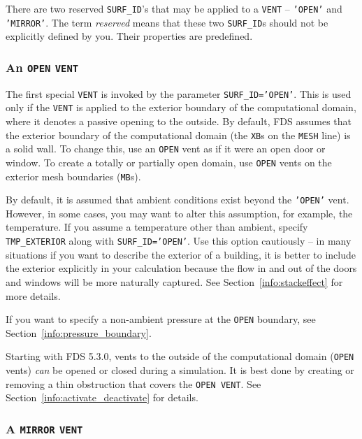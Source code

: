 \documentclass[11pt]{book}
\newcommand{\ct}{\tt\small}
\begin{document}
There are two reserved {\ct SURF\_ID}'s that may be applied to a {\ct VENT} -- {\ct 'OPEN'} and {\ct 'MIRROR'}. The term {\em reserved} means that these two
{\ct SURF\_ID}s should not be explicitly defined by you. Their properties are predefined.

\subsubsection{An \texorpdfstring{{\tt OPEN}}{OPEN} \texorpdfstring{{\tt VENT}}{VENT}}

The first special {\ct VENT} is invoked by the parameter {\ct SURF\_ID='OPEN'}. This is used only if the {\ct VENT}
is applied to the exterior boundary of the computational domain, where
it denotes a passive opening to the outside. By default, FDS assumes that the exterior boundary of the computational domain (the {\ct XB}s on the {\ct MESH} line) is a solid wall. To
change this, use an {\ct OPEN} vent as if it were an open door or window. To create a totally or partially open domain, use {\ct OPEN} vents on the exterior mesh boundaries ({\ct MB}s).

By default, it is assumed that ambient conditions exist beyond the
{\ct 'OPEN'} vent. However, in some cases, you may want to alter this assumption, for example, the temperature. If you assume a temperature other than
ambient, specify {\ct TMP\_EXTERIOR} along with {\ct SURF\_ID='OPEN'}. Use this option cautiously -- in many situations if you want to describe the exterior of a building, it is better
to include the exterior explicitly in your calculation because the flow in and out of the doors and windows will be more naturally captured. See Section~\ref{info:stackeffect} for more
details.

If you want to specify a non-ambient pressure at the {\ct OPEN} boundary, see Section~\ref{info:pressure_boundary}.

\begin{warning}
Starting with FDS 5.3.0, vents to the outside of the computational domain ({\ct OPEN} vents)
{\em  can} be opened or closed during a simulation. It is best done by creating or removing a thin obstruction that covers the {\ct OPEN VENT}.
See Section~\ref{info:activate_deactivate} for details.
\end{warning}

\subsubsection{A \texorpdfstring{{\tt MIRROR}}{MIRROR} \texorpdfstring{{\tt VENT}}{VENT}}
\end{document}
